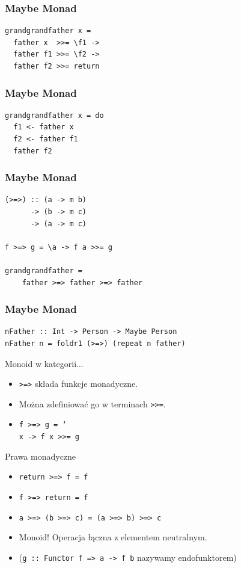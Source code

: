 \documentclass[14pt]{beamer}
\begin{document}
\begin{frame}[fragile]
\frametitle{Maybe Monad}
\begin{verbatim}
grandgrandfather x =
  father x  >>= \f1 ->
  father f1 >>= \f2 ->
  father f2 >>= return
\end{verbatim}
\end{frame}

\begin{frame}[fragile]
\frametitle{Maybe Monad}
\begin{verbatim}
grandgrandfather x = do
  f1 <- father x
  f2 <- father f1
  father f2
\end{verbatim}
\end{frame}

\begin{frame}[fragile]
\frametitle{Maybe Monad}
\begin{verbatim}
(>=>) :: (a -> m b)
      -> (b -> m c)
      -> (a -> m c)

f >=> g = \a -> f a >>= g

grandgrandfather =
    father >=> father >=> father
\end{verbatim}
\end{frame}

\begin{frame}[fragile]
\frametitle{Maybe Monad}
\begin{verbatim}
nFather :: Int -> Person -> Maybe Person
nFather n = foldr1 (>=>) (repeat n father)
\end{verbatim}
\end{frame}

\begin{frame}{Monoid w kategorii...}
    \begin{itemize}
        \item \texttt{>=>} składa funkcje monadyczne.
        \item Można zdefiniować go w terminach \texttt{>>=}.
        \item \texttt{f >=> g = \char`\\x -> f x >>= g}
    \end{itemize}
\end{frame}

\begin{frame}{Prawa monadyczne}
    \begin{itemize}
        \item \texttt{return >=> f = f}
        \item \texttt{f >=> return = f}
        \item \texttt{a >=> (b >=> c) = (a >=> b) >=> c}
        \pause
        \item Monoid! Operacja łączna z elementem neutralnym.
        \item (\texttt{g :: Functor f => a -> f b} nazywamy endofunktorem)
    \end{itemize}
\end{frame}
\end{document}
